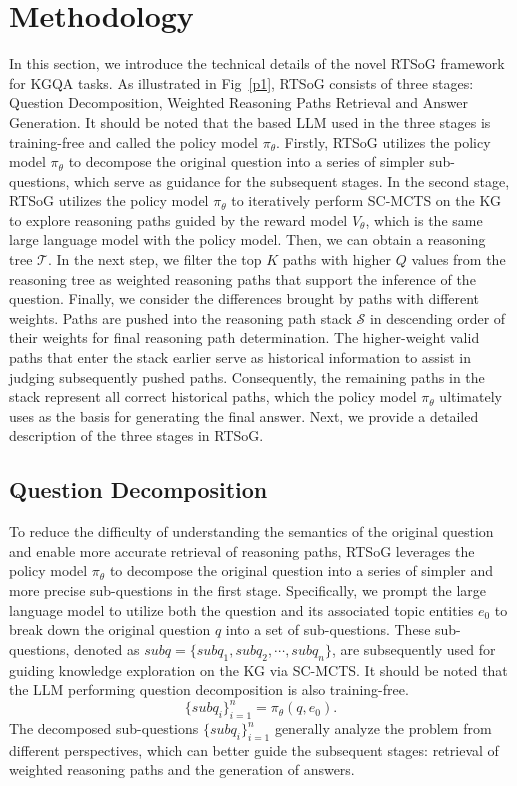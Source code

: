 \documentclass[lettersize,journal]{IEEEtran}
\begin{document}
\section{Methodology}
In this section, we introduce the technical details of the novel RTSoG framework for KGQA tasks. As illustrated in Fig~\ref{p1}, RTSoG consists of three stages: Question Decomposition, Weighted Reasoning Paths Retrieval and Answer Generation. It should be noted that the based LLM used in the three stages is training-free and called the policy model $\pi_{\theta}$. Firstly, RTSoG utilizes the policy model $\pi_{\theta}$ to decompose the original question into a series of simpler sub-questions, which serve as guidance for the subsequent stages. In the second stage, RTSoG utilizes the policy model $\pi_{\theta}$ to iteratively perform SC-MCTS on the KG to explore reasoning paths guided by the reward model $V_{\theta}$, which is the same large language model with the policy model. Then, we can obtain a reasoning tree $\mathcal{T}$. In the next step, we filter the top $K$ paths with higher $Q$ values from the reasoning tree as weighted reasoning paths that support the inference of the question. Finally, we consider the differences brought by paths with different weights. Paths are pushed into the reasoning path stack $\mathcal{S}$ in descending order of their weights for final reasoning path determination. The higher-weight valid paths that enter the stack earlier serve as historical information to assist in judging subsequently pushed paths. Consequently, the remaining paths in the stack represent all correct historical paths, which the policy model $\pi_{\theta}$ ultimately uses as the basis for generating the final answer. Next, we provide a detailed description of the three stages in RTSoG.
\subsection{Question Decomposition}
To reduce the difficulty of understanding the semantics of the original question and enable more accurate retrieval of reasoning paths, RTSoG leverages the policy model $\pi_{\theta}$ to decompose the original question into a series of simpler and more precise sub-questions in the first stage. Specifically, we prompt the large language model to utilize both the question and its associated topic entities $e_0$ to break down the original question $q$ into a set of sub-questions. These sub-questions, denoted as $subq = \{ subq_1, subq_2, \cdots, subq_{n} \}$, are subsequently used for guiding knowledge exploration on the KG via SC-MCTS. It should be noted that the LLM performing question decomposition is also training-free.
\begin{equation}
   \{ subq_i \}_{i=1}^{n} = \pi_{\theta}(q, e_0).
\end{equation}
The decomposed sub-questions $\{ subq_i \}_{i=1}^{n}$ generally analyze the problem from different perspectives, which can better guide the subsequent stages: retrieval of weighted reasoning paths and the generation of answers. 
\end{document}
